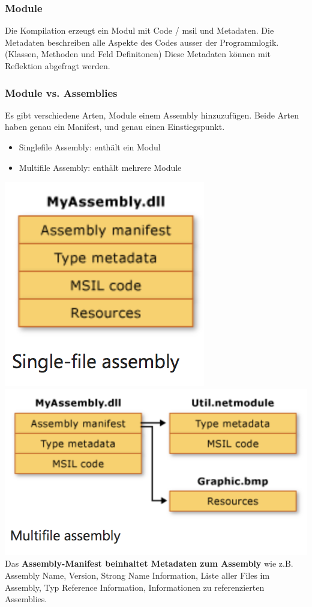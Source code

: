 \documentclass[
a4paper,
oneside,
10pt,
fleqn,
headsepline,
toc=listofnumbered, 
bibliography=totocnumbered]{scrartcl}
\begin{document}
\subsubsection{Module}
Die Kompilation erzeugt ein Modul mit Code / \gls{msil} und Metadaten. Die Metadaten beschreiben alle Aspekte des Codes ausser der Programmlogik. (Klassen, Methoden und Feld Definitonen) Diese Metadaten können mit Reflektion abgefragt werden.

\subsubsection{Module vs. Assemblies}
Es gibt verschiedene Arten, Module einem Assembly hinzuzufügen. Beide Arten haben genau ein Manifest, und genau einen Einstiegspunkt.
\begin{itemize}
    \item Singlefile Assembly: enthält ein Modul
    \item Multifile Assembly: enthält mehrere Module
\end{itemize}

\includegraphics{images/singlefile_assembly.png}
\includegraphics{images/multifile_assembly.png}
\\
Das \textbf{Assembly-Manifest beinhaltet Metadaten zum Assembly} wie z.B. Assembly Name, Version, Strong Name Information, Liste aller Files im Assembly, Typ Reference Information, Informationen zu referenzierten Assemblies.
\end{document}
